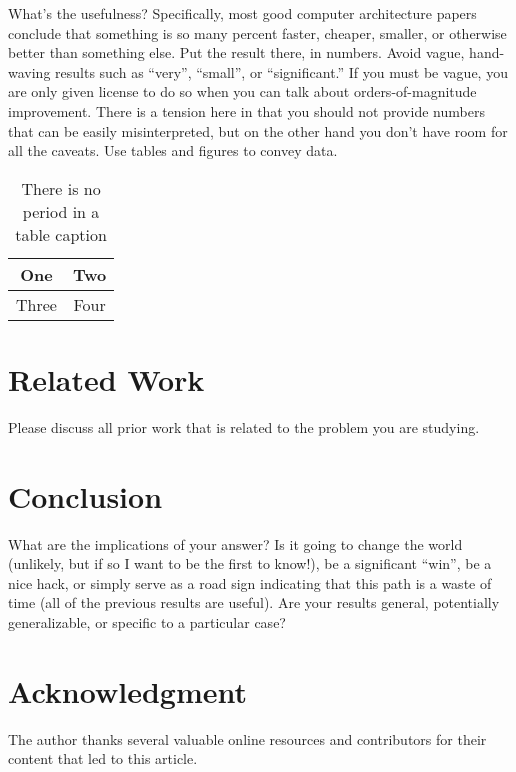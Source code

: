 \documentclass[conference]{IEEEtran}
\begin{document}
What's the usefulness? Specifically, most good computer architecture papers conclude that something is so many percent faster, cheaper, smaller, or otherwise better than something else. Put the result there, in numbers. Avoid vague, hand-waving results such as ``very'', ``small'', or ``significant.'' If you must be vague, you are only given license to do so when you can talk about orders-of-magnitude improvement. There is a tension here in that you should not provide numbers that can be easily misinterpreted, but on the other hand you don't have room for all the caveats. Use tables and figures to convey data.



\begin{table}[h]
\renewcommand{\arraystretch}{1.3}
\caption{There is no period in a table caption}
\label{table_example}
\centering
\begin{tabular}{|c||c|}
\hline
One & Two\\
\hline
Three & Four\\
\hline
\end{tabular}
\end{table}
\renewcommand{\arraystretch}{1}

\section{Related Work}

Please discuss all prior work that is related to the problem you are studying.

\section{Conclusion}

What are the implications of your answer? Is it going to change the world (unlikely, but if so I want to be the first to know!), be a significant ``win'', be a nice hack, or simply serve as a road sign indicating that this path is a waste of time (all of the previous results are useful). Are your results general, potentially generalizable, or specific to a particular case?

\section*{Acknowledgment}

The author thanks several valuable online resources and contributors for their content that led to this article.





\end{document}
